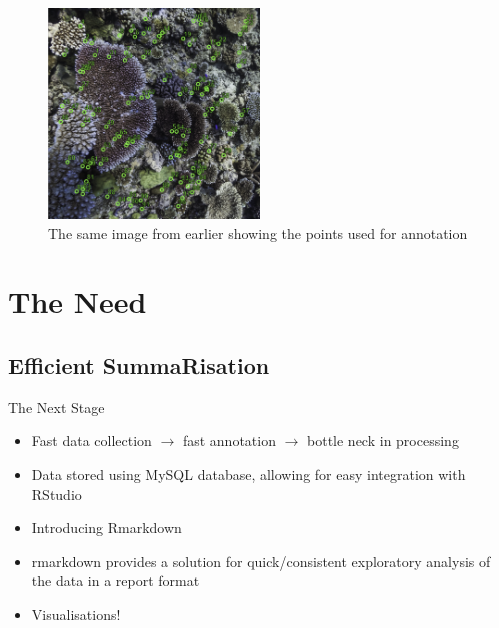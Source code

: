 \documentclass{beamer}
\begin{document}
              \begin{frame}
                  \begin{figure}
                      \centering
                      \includegraphics[width = 0.5\textwidth]{coral_points.jpg}
                      \caption{The same image from earlier showing the points used for annotation}
                  \end{figure}
              \end{frame}

    \section{The Need}
        \subsection{Efficient SummaRisation}
            \begin{frame}{The Next Stage}
                \begin{itemize}
                  \item Fast data collection $\rightarrow$ fast annotation $\rightarrow$ bottle neck in processing
                  \item Data stored using MySQL database, allowing for easy integration with RStudio\footnotemark {}
                  \item Introducing Rmarkdown\footnotemark {}
                  \item rmarkdown provides a solution for quick/consistent exploratory analysis of the data in a report format
                  \item Visualisations\footnotemark! 
                \end{itemize}
            \end{frame}
\end{document}
